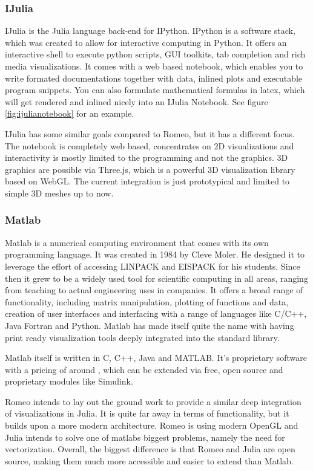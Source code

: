 \subsubsection{IJulia}
IJulia is the Julia language back-end for IPython.
IPython is a software stack, which was created to allow for interactive computing in Python.
It offers an interactive shell to execute python scripts, \ac{GUI} toolkits, tab completion and rich media visualizations.
It comes with a web based notebook, which enables you to write formated documentations together with data, inlined plots and executable program snippets. You can also formulate mathematical formulas in latex, which will get rendered and inlined nicely into an IJulia Notebook.
See figure \ref{fig:ijulianotebook} for an example.

IJulia has some similar goals compared to Romeo, but it has a different focus.
The notebook is completely web based, concentrates on 2D visualizations and interactivity is mostly limited to the programming and not the graphics.
3D graphics are possible via Three.js, which is a powerful 3D visualization library based on WebGL.
The current integration is just prototypical and limited to simple 3D meshes up to now.


\subsubsection{Matlab}

\ac{Matlab} is a numerical computing environment that comes with its own programming language.
It was created in 1984 by Cleve Moler. He designed it to leverage the effort of accessing LINPACK and EISPACK for his students.
Since then it grew to be a widely used tool for scientific computing in all areas, ranging from teaching to actual engineering uses in companies.
It offers a broad range of functionality, including matrix manipulation, plotting of functions and data, creation of user interfaces and interfacing with a range of languages like C/C++, Java Fortran and Python. 
Matlab has made itself quite the name with having print ready visualization tools deeply integrated into the standard library.

\ac{Matlab} itself is written in C, C++, Java and MATLAB.
It's proprietary software with a pricing of around \cite{MatlabPricing}, which can be extended via free, open source and proprietary modules like Simulink.

Romeo intends to lay out the ground work to provide a similar deep integration of visualizations in Julia. 
It is quite far away in terms of functionality, but it builds upon a more modern architecture.
Romeo is using modern OpenGL and Julia intends to solve one of matlabs biggest problems, namely the need for vectorization.
Overall, the biggest difference is that Romeo and Julia are open source, making them much more accessible and easier to extend than Matlab.


